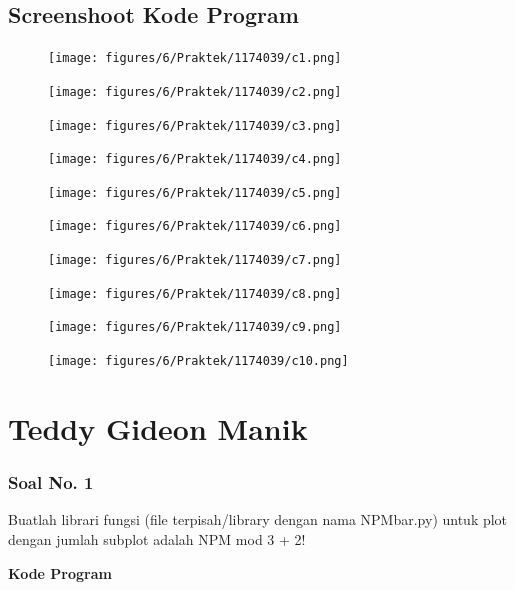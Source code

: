 \subsection{Screenshoot Kode Program}
\begin{figure}[H]
	\texttt{[image: figures/6/Praktek/1174039/c1.png]}
	\centering
\end{figure}
\begin{figure}[H]
	\texttt{[image: figures/6/Praktek/1174039/c2.png]}
	\centering
\end{figure}
\begin{figure}[H]
	\texttt{[image: figures/6/Praktek/1174039/c3.png]}
	\centering
\end{figure}
\begin{figure}[H]
	\texttt{[image: figures/6/Praktek/1174039/c4.png]}
	\centering
\end{figure}
\begin{figure}[H]
	\texttt{[image: figures/6/Praktek/1174039/c5.png]}
	\centering
\end{figure}
\begin{figure}[H]
	\texttt{[image: figures/6/Praktek/1174039/c6.png]}
	\centering
\end{figure}
\begin{figure}[H]
	\texttt{[image: figures/6/Praktek/1174039/c7.png]}
	\centering
\end{figure}
\begin{figure}[H]
	\texttt{[image: figures/6/Praktek/1174039/c8.png]}
	\centering
\end{figure}
\begin{figure}[H]
	\texttt{[image: figures/6/Praktek/1174039/c9.png]}
	\centering
\end{figure}
\begin{figure}[H]
	\texttt{[image: figures/6/Praktek/1174039/c10.png]}
	\centering
\end{figure}

\section{Teddy Gideon Manik}
\subsubsection{Soal No. 1}
\hfill \break
Buatlah librari fungsi (file terpisah/library dengan nama NPMbar.py) untuk plot dengan jumlah subplot adalah NPM mod 3 + 2!

\hfill \break
\textbf{Kode Program}

